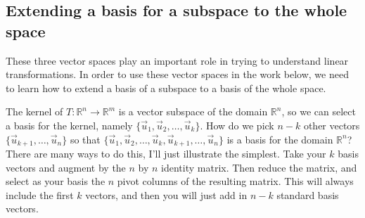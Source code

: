 \documentclass[10pt]{article}
\theoremstyle{plain}
\theoremstyle{box}
\begin{document}
\subsection{Extending a basis for a subspace to the whole space}
These three vector spaces play an important role in trying to understand linear transformations. In order to use these vector spaces in the work below, we need to learn how to extend a basis of a subspace to a basis of the whole space.  

The kernel of $T:{\mathbb{R}}^n\to{\mathbb{R}}^m$ is a vector subspace of the domain ${\mathbb{R}}^n$, so we can select a basis for the kernel, namely $\{\vec u_1, \vec u_2,\ldots, \vec u_k\}$. How do we pick $n-k$ other vectors $\{\vec u_{k+1},\ldots, \vec u_n\}$ so that $\{\vec u_1, \vec u_2,\ldots, \vec u_k,\vec u_{k+1},\ldots, \vec u_n\}$ is a basis for the domain ${\mathbb{R}}^n$? There are many ways to do this, I'll just illustrate the simplest.  Take your $k$ basis vectors and augment by the $n$ by $n$ identity matrix.  Then reduce the matrix, and select as your basis the $n$ pivot columns of the resulting matrix.  This will always include the first $k$ vectors, and then you will just add in $n-k$ standard basis vectors.
\end{document}
